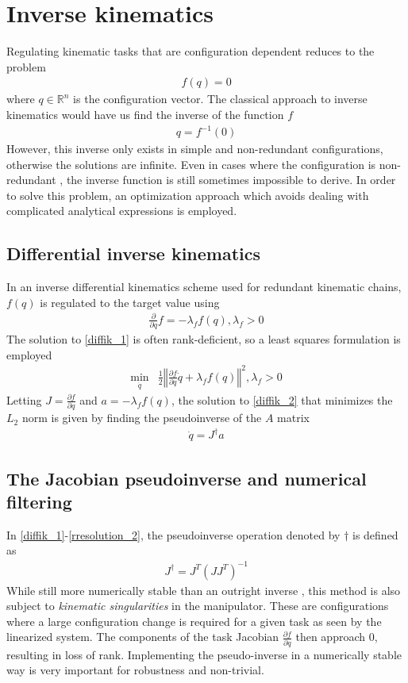 \documentclass[times, utf8, diplomski, english]{fer}
\begin{document}
\section{Inverse kinematics}\label{section:inverse kinematics}
Regulating kinematic tasks that are configuration dependent reduces to the problem
\begin{align}
f\left(q\right) = 0 %
\end{align}
where $q \in \mathbb{R}^{n} $  is the configuration vector. 
The classical approach to inverse kinematics would have us find the inverse of the function $f$
\begin{align}
q = f^{-1}\left(0\right)
\end{align}
However, this inverse only exists in simple and non-redundant configurations, otherwise the solutions are infinite.
Even in cases where the configuration is non-redundant , the inverse function is still sometimes impossible to derive.
In order to solve this problem, an optimization approach which avoids dealing with complicated analytical expressions is employed.
\subsection{Differential inverse kinematics}
In an inverse differential kinematics scheme used for redundant kinematic chains, $f\left(q\right)$ is regulated to the target value using
\begin{align}
\label{diffik_1}
\frac{\partial}{\partial q}f = -\lambda_{f}f\left(q\right), \lambda_{f} > 0
\end{align}
The solution to \ref{diffik_1} is often rank-deficient, so a least squares formulation is employed
\begin{align}
\label{diffik_2}
\min\limits_{\dot{q}} & \frac{1}{2}\left\Vert\frac{\partial f}{\partial q} \dot{q} + \lambda_{f}f\left(q\right)\right\Vert^2, \lambda_{f} > 0
\end{align}
Letting $J = \frac{\partial f}{\partial q}$ and $a = -\lambda_{f}f\left(q\right)$, the solution to \ref{diffik_2} that minimizes the $L_{2}$ norm is given by finding the pseudoinverse of the $A$ matrix
\begin{align}
\label{diffik_4}
\dot{q} = J^{\dagger}a 
\end{align}
\subsection{The Jacobian pseudoinverse and numerical filtering}
In \eqref{diffik_1}-\eqref{rresolution_2}, the pseudoinverse operation denoted by $\dagger$ is defined as 
\begin{align}
J^{\dagger} = J^T\left(JJ^T\right)^{-1}
\end{align}
While still more numerically stable than an outright inverse , this method is also subject to \textit{kinematic singularities} in the manipulator.
These are configurations where a large configuration change is required for a given task as seen by the linearized system.
The components of the task Jacobian $\frac{\partial f}{\partial q}$ then approach 0, resulting in loss of rank.
Implementing the pseudo-inverse in a numerically stable way is very important for robustness and non-trivial.
\end{document}

